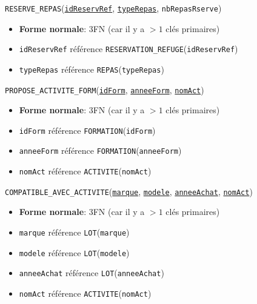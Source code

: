 \documentclass[12pt, a4paper]{article}
\newcommand\att[1]{\textnhtt{#1}}
\begin{document}
\att{RESERVE\_REPAS}(\att{\underline{idReservRef}}, \att{\underline{typeRepas}}, \att{nbRepasRserve})
\begin{itemize}
\item \textbf{Forme normale}: 3FN (car il y a $>1$ clés primaires)
\item \att{idReservRef} référence \att{RESERVATION\_REFUGE}(\att{idReservRef})
\item \att{typeRepas} référence \att{REPAS}(\att{typeRepas})
\end{itemize}

\att{PROPOSE\_ACTIVITE\_FORM}(\att{\underline{idForm}}, \att{\underline{anneeForm}}, \att{\underline{nomAct}})
\begin{itemize}
\item \textbf{Forme normale}: 3FN (car il y a $>1$ clés primaires)
\item \att{idForm} référence \att{FORMATION}(\att{idForm})
\item \att{anneeForm} référence \att{FORMATION}(\att{anneeForm})
\item \att{nomAct} référence \att{ACTIVITE}(\att{nomAct})
\end{itemize}

\att{COMPATIBLE\_AVEC\_ACTIVITE}(\att{\underline{marque}}, \att{\underline{modele}}, \att{\underline{anneeAchat}}, \att{\underline{nomAct}})
\begin{itemize}
\item \textbf{Forme normale}: 3FN (car il y a $>1$ clés primaires)
\item \att{marque} référence \att{LOT}(\att{marque})
\item \att{modele} référence \att{LOT}(\att{modele})
\item \att{anneeAchat} référence \att{LOT}(\att{anneeAchat})
\item \att{nomAct} référence \att{ACTIVITE}(\att{nomAct})
\end{itemize}

\end{document}
